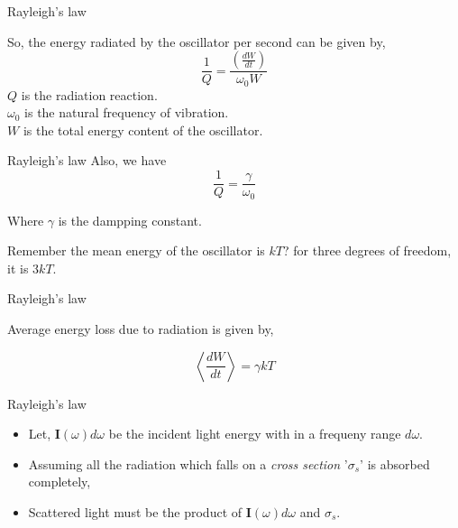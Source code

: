 \documentclass[aspectratio=169]{beamer}
\begin{document}
		
\begin{frame}{Rayleigh's law}
		
		So, the energy radiated  by the oscillator  per second can be given by, \newline
		{\large \[ \frac{1}{Q} = \frac{\left(\frac{dW}{dt}\right)}{\omega_0 W}\]}\newline
			{\small $Q$ is the radiation reaction. \\ $\omega_0$ is the natural frequency of vibration. \\ $W$ is the total energy content of the oscillator.} 
				
\end{frame}
	
		
\begin{frame}{Rayleigh's law}
		Also, we have 
		\[ \frac{1}{Q}= \frac{\gamma}{\omega_0} \]
			
			\begin{center}		
				{\small Where $\gamma$ is the dampping constant.}
			\end{center}
			
		Remember the mean energy of the oscillator is $kT$? for three degrees of freedom, it is $3kT$.
		
\end{frame}


\begin{frame}{Rayleigh's law}

	 \begin{center}
	 
	 	{\large Average energy loss due to radiation is given by,} \newline
	 	
	  \end{center} 
	  
	 {\large \[ \boxed{\left<\frac{dW}{dt}\right> = \gamma kT}\]}	 		

\end{frame}
		
\begin{frame}{Rayleigh's law}
	
	\begin{itemize}
		
		\item Let, $ \mathbf{I}(\omega)d\omega $ be the incident light energy with in a frequeny range $d\omega$. \newline
		\item Assuming all the radiation which falls on a \textit{cross section} '$\sigma_s$' is absorbed completely, \newline
		\item Scattered light must be the product of $ \mathbf{I}(\omega)d\omega $ and $ \sigma_s $.

	\end{itemize}
	
\end{frame}
			
\end{document}
